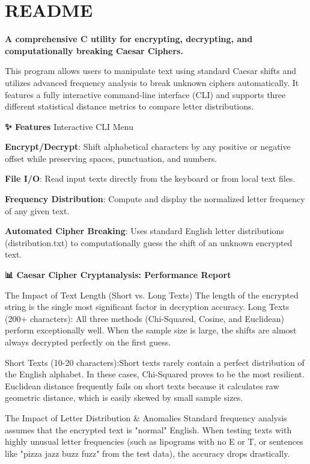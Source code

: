 \chapter{README }
\hypertarget{md__r_e_a_d_m_e}{}\label{md__r_e_a_d_m_e}
{\bfseries{A comprehensive C utility for encrypting, decrypting, and computationally breaking Caesar Ciphers.}}

This program allows users to manipulate text using standard Caesar shifts and utilizes advanced frequency analysis to break unknown ciphers automatically. It features a fully interactive command-\/line interface (CLI) and supports three different statistical distance metrics to compare letter distributions.

{\bfseries{✨ Features}} Interactive CLI Menu

{\bfseries{Encrypt/\+\+Decrypt}}:\+ Shift alphabetical characters by any positive or negative offset while preserving spaces, punctuation, and numbers.

{\bfseries{File I/\+O}}:\+ Read input texts directly from the keyboard or from local text files.

{\bfseries{Frequency Distribution}}:\+ Compute and display the normalized letter frequency of any given text.

{\bfseries{Automated Cipher Breaking}}:\+ Uses standard English letter distributions (distribution.\+txt) to computationally guess the shift of an unknown encrypted text.

{\bfseries{📊 Caesar Cipher Cryptanalysis:\+ Performance Report}}


\begin{DoxyEnumerate}
\item The Impact of Text Length (Short vs. Long Texts) The length of the encrypted string is the single most significant factor in decryption accuracy. Long Texts (200+ characters):\+ All three methods (Chi-\/\+Squared, Cosine, and Euclidean) perform exceptionally well. When the sample size is large, the shifts are almost always decrypted perfectly on the first guess.

Short Texts (10-\/20 characters):\+Short texts rarely contain a perfect distribution of the English alphabet. In these cases, Chi-\/\+Squared proves to be the most resilient. Euclidean distance frequently fails on short texts because it calculates raw geometric distance, which is easily skewed by small sample sizes.
\item The Impact of Letter Distribution \& Anomalies Standard frequency analysis assumes that the encrypted text is "{}normal"{} English. When testing texts with highly unusual letter frequencies (such as lipograms with no \textquotesingle{}E\textquotesingle{} or \textquotesingle{}T\textquotesingle{}, or sentences like "{}pizza jazz buzz fuzz"{} from the test data), the accuracy drops drastically.
\end{DoxyEnumerate}

